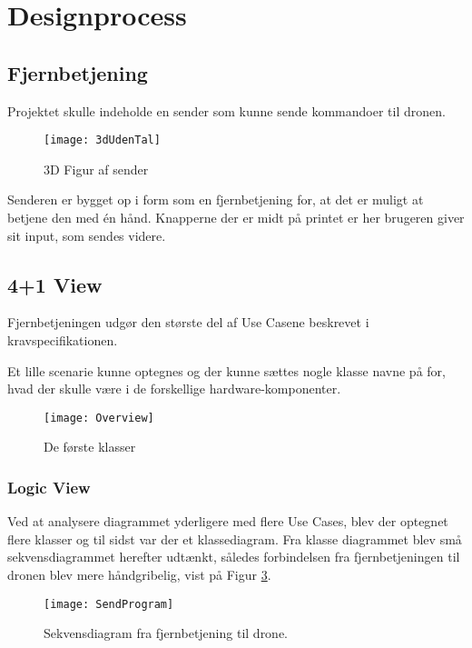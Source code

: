 \documentclass[Main]{subfiles}
\begin{document}
\section{Designprocess}

\subsection{Fjernbetjening}

Projektet skulle indeholde en sender som kunne sende kommandoer til dronen.

\begin{figure}[H]
\centering
\texttt{[image: 3dUdenTal]}
\caption{3D Figur af sender}
\label{Fig:3dUdenTal}
\end{figure}


Senderen er bygget op i form som en fjernbetjening for, at det er muligt at betjene den med én hånd.
Knapperne der er midt på printet er her brugeren giver sit input, som sendes videre.


\subsection{4+1 View}
Fjernbetjeningen udgør den største del af Use Casene beskrevet i kravspecifikationen\cite[s. 7 -- 11]{Kravspec}.

Et lille scenarie kunne optegnes og der kunne sættes nogle klasse navne på for, hvad der skulle være i de forskellige hardware-komponenter.

\begin{figure}[H]
\centering
\texttt{[image: Overview]}
\caption{De første klasser}
\label{Fig:Overview}
\end{figure}




\subsubsection*{Logic View}
Ved at analysere diagrammet yderligere med flere Use Cases, blev der optegnet flere klasser og til sidst var der et klassediagram. 
Fra klasse diagrammet blev små sekvensdiagrammet herefter udtænkt, således forbindelsen fra fjernbetjeningen til dronen blev mere håndgribelig, vist på Figur \ref{Fig:sendProgram}.

\begin{figure}[H]
\centering
\texttt{[image: SendProgram]}
\caption{Sekvensdiagram fra fjernbetjening til drone.}
\label{Fig:sendProgram}
\end{figure}
\end{document}
